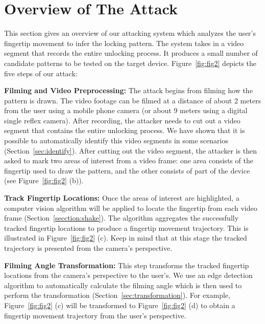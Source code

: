 \section{Overview of The Attack}
\label{section:overview}
     This section gives an overview of our attacking system which analyzes the user's fingertip movement to infer the locking pattern. The system takes in a video segment that records the entire unlocking process. It produces a small number of candidate patterns to be tested on the target device.
    Figure~\ref{fig:fig2} depicts the five steps of our attack:

    \vspace{2mm}
    \noindent {} \textbf{Filming and Video Preprocessing:} The attack begins from
        filming how the pattern is drawn. The video footage can be filmed at a distance of
        about 2 meters from the user using a mobile phone camera (or about 9 meters using a digital single reflex camera). After recording, the attacker
        needs to cut out a video segment that contains the entire unlocking
        process. We have shown that it is possible to automatically identify this video segments in some scenarios (Section~\ref{sec:identify}).
        After cutting out the video segment, the attacker is then asked to mark two areas of interest from a video frame: one area consists of
        the fingertip used to draw the pattern, and the other consists of part of the device (see
    Figure~\ref{fig:fig2} (b)).

     \vspace{2mm}
    \noindent {}  \textbf{Track Fingertip Locations:} Once the areas of interest are highlighted, a computer vision algorithm will be applied
        to locate the fingertip from each video frame (Section~\ref{secction:shake}). The algorithm aggregates the successfully tracked fingertip locations to produce a fingertip movement trajectory.
        This is illustrated in Figure~\ref{fig:fig2} (c). Keep in mind that at this stage the tracked trajectory is presented from the camera's perspective.

     \vspace{2mm}
    \noindent {} \textbf{Filming Angle Transformation:}  This step transforms the tracked fingertip locations from the camera's perspective to the user's.
    We use an edge detection algorithm to automatically calculate the filming angle which is then used to perform the transformation (Section~\ref{sec:transformation}).
    For example, Figure~\ref{fig:fig2} (c) will be transformed to Figure~\ref{fig:fig2} (d) to obtain a fingertip movement trajectory from the user's perspective.

